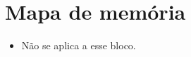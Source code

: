 \section{Mapa de memória} %
\label{sec:mapa_de_memória}

\begin{itemize}
  \item Não se aplica a esse bloco.

\end{itemize}
